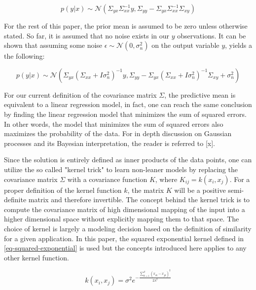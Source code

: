 \documentclass[useAMS,usenatbib,fleqn]{mn2e}
\begin{document}
\begin{equation}
\label{eq-conditional-zero-mean}
p(y|x) \sim  \mathcal{N} \left ( \Sigma_{yx}\Sigma_{xx}^{-1}y, \Sigma_{yy}-\Sigma_{yx}\Sigma_{xx}^{-1}\Sigma_{xy}\right )
\end{equation}

For the rest of this paper, the prior mean is assumed to be zero unless otherwise stated. So far, it is assumed that no noise exists in our $y$ observations. It can be shown that assuming some noise $\epsilon \sim \mathcal{N}\left(0,\sigma_{n}^{2}\right)$ on the output variable $y$, yields a the following:

\begin{equation}
\label{eq-mean-variance-noise}
p(y|x) \sim  \mathcal{N} \left ( \Sigma_{yx}\left(\Sigma_{xx}+I\sigma_{n}^{2}\right)^{-1}y, \Sigma_{yy}-\Sigma_{yx}\left(\Sigma_{xx}+I\sigma_{n}^{2}\right)^{-1}\Sigma_{xy}+\sigma_{n}^{2}\right )
\end{equation}

For our current definition of the covariance matrix $\Sigma$, the predictive mean is equivalent to a linear regression model, in fact, one can reach the same conclusion by finding the linear regression model that minimizes the sum of squared errors. In other words, the model that minimizes the sum of squared errors also maximizes the probability of the data. For in depth discussion on Gaussian processes and its Bayesian interpretation, the reader is referred to [x].

Since the solution is entirely defined as inner products of the data points, one can utilize the so called "kernel trick" to learn non-leaner models by replacing the covariance matrix $\Sigma$ with a covariance function $K$, where $K_{ij} = k(x_{i},x_{j})$. For a proper definition of the kernel function $k$, the matrix $K$ will be a positive semi-definite matrix and therefore invertible. The concept behind the kernel trick is to compute the covariance matrix of high dimensional mapping of the input into a higher dimensional space without explicitly mapping them to that space. The choice of kernel is largely a modeling decision based on the definition of similarity for a given application. In this paper, the squared exponential kernel defined in \eqref{eq-squared-exponential} is used but the concepts introduced here applies to any other kernel function.

\begin{equation}
\label{eq-squared-exponential}
k(x_{i},x_{j}) = \sigma^{2}e^{-\frac{\sum_{k=1}^{d}(x_{ik}-x_{jk})^{2}}{2\lambda^{2}}}
\end{equation}
\end{document}
